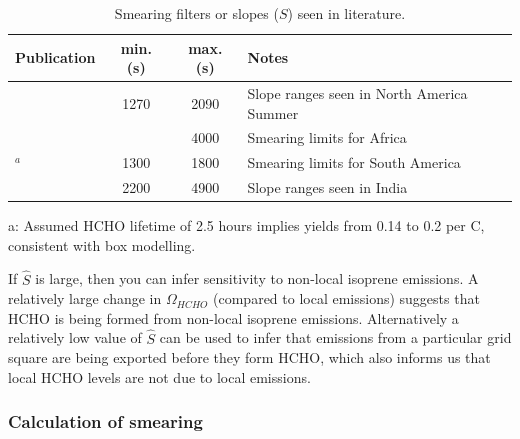     \begin{table}\begin{threeparttable}
        \caption{Smearing filters or slopes ($S$) seen in literature.}
        \begin{tabular}{ l | c  c  >{\centering\arraybackslash}p{5cm} } 
          \toprule
          Publication & min. (s) & max. (s) & Notes \\
          \midrule
          \textcite{Palmer2003}      & 1270 & 2090 & Slope ranges seen in North America Summer \\
          \textcite{Marais2012}      &      & 4000 & Smearing limits for Africa \\
          \textcite{Barkley2013}$^a$ & 1300 & 1800 & Smearing limits for South America \\
          \textcite{Surl2018}        & 2200 & 4900 & Slope ranges seen in India \\
          
          \bottomrule
        \end{tabular}
        \begin{tablenotes} 
          \item a: Assumed HCHO lifetime of 2.5 hours implies yields from 0.14 to 0.2 per C, consistent with box modelling.
        \end{tablenotes}
        \label{BioIsop:Method:Smearing:tab_smearing_ranges}
      \end{threeparttable}\end{table}
    
    If $\hat{S}$ is large, then you can infer sensitivity to non-local isoprene emissions.
    A relatively large change in $\Omega_{HCHO}$ (compared to local emissions) suggests that HCHO is being formed from non-local isoprene emissions.
    Alternatively a relatively low value of $\hat{S}$ can be used to infer that emissions from a particular grid square are being exported before they form HCHO, which also informs us that local HCHO levels are not due to local emissions.
    
    
    \subsubsection{Calculation of smearing}
    \label{BioIsop:Method:Smearing:calculation}
    
